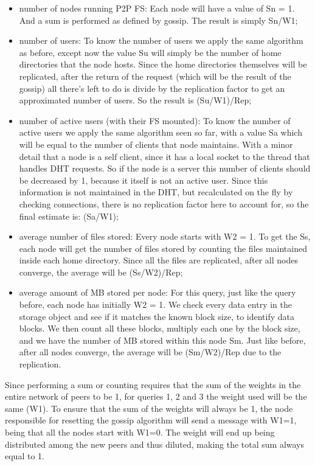 \documentclass[times,9pt,article]{llncs}
\begin{document}
\begin{itemize}
\item number of nodes running P2P FS: Each node will have a value of Sn = 1. And a sum is performed as defined by gossip. The result is simply Sn/W1;
\item number of users: To know the number of users we apply the same algorithm as before, except now the value Su will simply be the number of home directories that the node hosts. Since the home directories themselves will be replicated, after the return of the request (which will be the result of the gossip) all there's left to do is divide by the replication factor to get an approximated number of users. So the result is (Su/W1)/Rep;
\item number of active users (with their FS mounted): To know the number of active users we apply the same algorithm seen so far, with a value Sa which will be equal to the number of clients that node maintains. With a minor detail that a node is a self client, since it has a local socket to the thread that handles DHT requests. So if the node is a server this number of clients should be decreased by 1, because it itself is not an active user. Since this information is not maintained in the DHT, but recalculated on the fly by checking connections, there is no replication factor here to account for, so the final estimate is: (Sa/W1);
\item average number of files stored: Every node starts with W2 = 1. To get the Ss, each node will get the number of files stored by counting the files maintained inside each home directory. Since all the ﬁles are replicated, after all nodes converge, the average will be (Ss/W2)/Rep;
\item average amount of MB stored per node: For this query, just like the query before, each node has
initially W2 = 1. We check every data entry in the storage object and see if it matches the known block size, to identify data blocks. We then count all these blocks, multiply each one by the block size, and we have the number of MB stored within this node Sm. Just like before, after all nodes converge, the average will be (Sm/W2)/Rep due to the replication.
\end{itemize}
Since performing a sum or counting requires that the sum of the weights in the entire network of peers to be 1, for queries 1, 2 and 3 the weight used will be the same (W1). To ensure that the sum of the weights will always be 1, the node responsible for resetting the gossip algorithm will send a message with W1=1, being that all the nodes start with W1=0. The weight will end up being distributed among the new peers and thus diluted, making the total sum always equal to 1.
\end{document}
